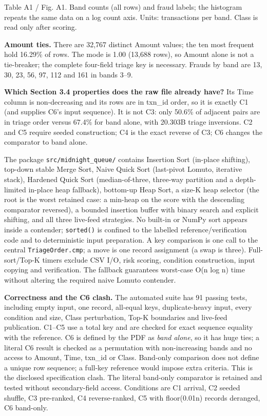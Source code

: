 \documentclass[10pt,a4paper]{article}
\newcommand{\sectiontitle}[1]{\par\vspace{4pt}{\color{teal}\fontsize{12}{14}\selectfont\bfseries #1}\par\vspace{1pt}}
\newcommand{\figcaption}[1]{\par{\fontsize{6.2}{7.1}\selectfont\color{muted}#1}\par\vspace{1pt}}
\begin{document}
\figcaption{Table A1 / Fig. A1. Band counts (all rows) and fraud labels; the histogram repeats the same data on a log count axis. Units: transactions per band. Class is read only after scoring.}

\textbf{Amount ties.} There are 32,767 distinct Amount values; the ten most frequent hold 16.29\% of rows. The mode is 1.00 (13,688 rows), so Amount alone is not a tie-breaker; the complete four-field triage key is necessary. Frauds by band are 13, 30, 23, 56, 97, 112 and 161 in bands 3--9.\par

\textbf{Which Section 3.4 properties does the raw file already have?} Its Time column is non-decreasing and its rows are in txn\_id order, so it is exactly C1 (and supplies C6's input sequence). It is not C3: only 50.6\% of adjacent pairs are in triage order versus 67.4\% for band alone, with 20.303B triage inversions. C2 and C5 require seeded construction; C4 is the exact reverse of C3; C6 changes the comparator to band alone.\par

\sectiontitle{B. Build the Contenders}

The package \texttt{src/midnight\_\allowbreak{}queue/} contains Insertion Sort (in-place shifting), top-down stable Merge Sort, Naive Quick Sort (last-pivot Lomuto, iterative stack), Hardened Quick Sort (median-of-three, three-way partition and a depth-limited in-place heap fallback), bottom-up Heap Sort, a size-K heap selector (the root is the worst retained case: a min-heap on the score with the descending comparator reversed), a bounded insertion buffer with binary search and explicit shifting, and all three live-feed strategies. No built-in or NumPy sort appears inside a contender; \texttt{sorted()} is confined to the labelled reference/verification code and to deterministic input preparation. A key comparison is one call to the central \texttt{TriageOrder.cmp}; a move is one record assignment (a swap is three). Full-sort/Top-K timers exclude CSV I/O, risk scoring, condition construction, input copying and verification. The fallback guarantees worst-case O(n log n) time without altering the required naive Lomuto contender.\par

\textbf{Correctness and the C6 clash.} The automated suite has 91 passing tests, including empty input, one record, all-equal keys, duplicate-heavy input, every condition and size, Class perturbation, Top-K boundaries and live-feed publication. C1--C5 use a total key and are checked for exact sequence equality with the reference. C6 is defined by the PDF as \textit{band alone}, so it has huge ties; a literal C6 result is checked as a permutation with non-increasing bands and no access to Amount, Time, txn\_id or Class. Band-only comparison does not define a unique row sequence; a full-key reference would impose extra criteria. This is the disclosed specification clash. The literal band-only comparator is retained and tested without secondary-field access. Conditions are C1 arrival, C2 seeded shuffle, C3 pre-ranked, C4 reverse-ranked, C5 with floor(0.01n) records deranged, C6 band-only.\par
\end{document}
